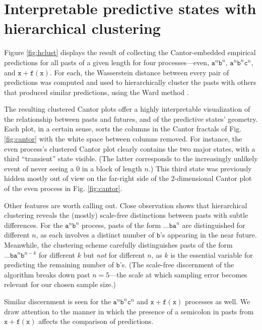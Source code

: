 \documentclass[draft,aps,pre,twocolumn,groupaddress,showkeys,nofootinbib,preprintnumbers,floatfix]{revtex4-2}
\begin{document}
\section{Interpretable predictive states with hierarchical clustering}

Figure \ref{fig:hclust} displays the result of collecting the Cantor-embedded
empirical predictions for all pasts of a given length for four processes---even,
$\mathtt{a}^n \mathtt{b}^n$, $\mathtt{a}^n \mathtt{b}^n \mathtt{c}^n$, and
$\mathtt{x+f(x)}$. For each, the Wasserstein distance between every pair of
predictions was computed and used to hierarchically cluster the pasts with
others that produced similar predictions, using the Ward method \cite{Mull11a}.

The resulting clustered Cantor plots offer a highly interpretable visualization
of the relationship between pasts and futures, and of the predictive states'
geometry. Each plot, in a certain sense, sorts the columns in the Cantor
fractals of Fig. \ref{fig:cantor} with the white space between columns removed.
For instance, the even process's clustered Cantor plot clearly contains the two
major states, with a third ``transient'' state visible. (The latter corresponds
to the increasingly unlikely event of never seeing a $0$ in a block of length
$n$.) This third state was previously hidden mostly out of view on the
far-right side of the $2$-dimensional Cantor plot of the even process in Fig.
\ref{fig:cantor}.

Other features are worth calling out. Close observation shows that hierarchical
clustering reveals the (mostly) scale-free distinctions between pasts with
subtle differences. For the $\mathtt{a}^n \mathtt{b}^n$ process, pasts of the
form $\dots \mathtt{b a}^n$ are distinguished for different $n$, as each
involves a distinct number of $\mathtt{b}$'s appearing in the near future.
Meanwhile, the clustering scheme carefully distinguishes pasts of the form
$\dots \mathtt{b a}^n \mathtt{b}^{n-k}$ for different $k$ but \emph{not} for
different $n$, as $k$ is the essential variable for predicting the remaining
number of $\mathtt{b}$'s. (The scale-free discernment of the algorithm breaks
down past $n=5$---the scale at which sampling error becomes relevant for our
chosen sample size.)

Similar discernment is seen for the $\mathtt{a}^n \mathtt{b}^n \mathtt{c}^n$
and $\mathtt{x+f(x)}$ processes as well. We draw attention to the manner in
which the presence of a semicolon in pasts from $\mathtt{x+f(x)}$ affects the
comparison of predictions.
\end{document}
